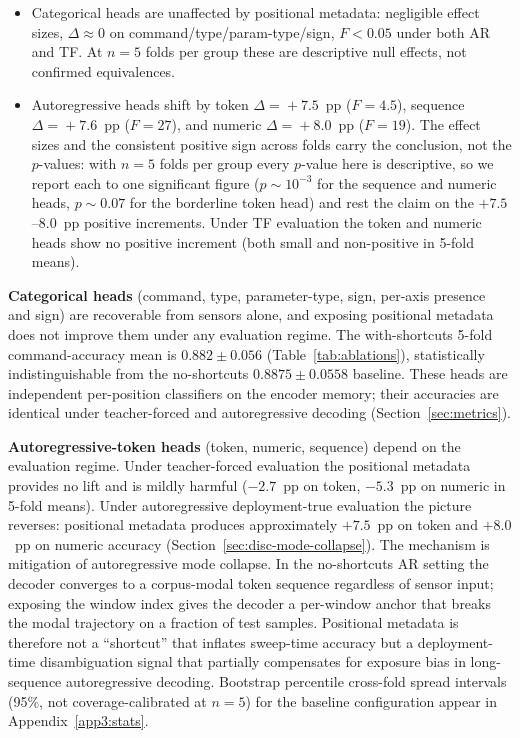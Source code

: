 \documentclass[sensors,article,submit,moreauthors,pdftex]{Definitions/mdpi}
\begin{document}
\begin{itemize}
\item Categorical heads are unaffected by positional metadata: negligible effect sizes, $\Delta\!\approx\!0$ on command/type/param-type/sign, $F<0.05$ under both AR and TF. At $n\!=\!5$ folds per group these are descriptive null effects, not confirmed equivalences.
\item Autoregressive heads shift by token $\Delta\!=\!+7.5$~pp ($F\!=\!4.5$), sequence $\Delta\!=\!+7.6$~pp ($F\!=\!27$), and numeric $\Delta\!=\!+8.0$~pp ($F\!=\!19$). The effect sizes and the consistent positive sign across folds carry the conclusion, not the $p$-values: with $n\!=\!5$ folds per group every $p$-value here is descriptive, so we report each to one significant figure ($p\!\sim\!10^{-3}$ for the sequence and numeric heads, $p\!\sim\!0.07$ for the borderline token head) and rest the claim on the $+7.5$--$8.0$~pp positive increments. Under TF evaluation the token and numeric heads show no positive increment (both small and non-positive in 5-fold means).
\end{itemize}

\textbf{Categorical heads} (command, type, parameter-type, sign, per-axis presence and sign) are recoverable from sensors alone, and exposing positional metadata does not improve them under any evaluation regime. The with-shortcuts 5-fold command-accuracy mean is $0.882 \pm 0.056$ (Table~\ref{tab:ablations}), statistically indistinguishable from the no-shortcuts $0.8875 \pm 0.0558$ baseline. These heads are independent per-position classifiers on the encoder memory; their accuracies are identical under teacher-forced and autoregressive decoding (Section~\ref{sec:metrics}).

\textbf{Autoregressive-token heads} (token, numeric, sequence) depend on the evaluation regime. Under teacher-forced evaluation the positional metadata provides no lift and is mildly harmful ($-2.7$~pp on token, $-5.3$~pp on numeric in 5-fold means). Under autoregressive deployment-true evaluation the picture reverses: positional metadata produces approximately $+7.5$~pp on token and $+8.0$~pp on numeric accuracy (Section~\ref{sec:disc-mode-collapse}). The mechanism is mitigation of autoregressive mode collapse. In the no-shortcuts AR setting the decoder converges to a corpus-modal token sequence regardless of sensor input; exposing the window index gives the decoder a per-window anchor that breaks the modal trajectory on a fraction of test samples. Positional metadata is therefore not a ``shortcut'' that inflates sweep-time accuracy but a deployment-time disambiguation signal that partially compensates for exposure bias in long-sequence autoregressive decoding. Bootstrap percentile cross-fold spread intervals (95\%, not coverage-calibrated at $n\!=\!5$) for the baseline configuration appear in Appendix~\ref{app3:stats}.
\end{document}
